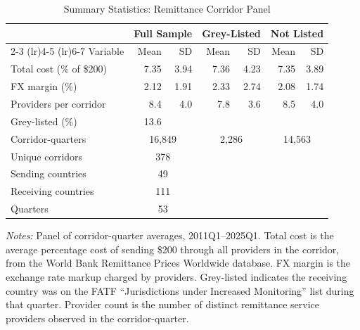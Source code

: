 \begin{table}[H]
\centering
\caption{Summary Statistics: Remittance Corridor Panel}
\label{tab:summary}
\begin{threeparttable}
\begin{tabular}{l rrrr rr}
\toprule
& \multicolumn{2}{c}{Full Sample} & \multicolumn{2}{c}{Grey-Listed} & \multicolumn{2}{c}{Not Listed} \\
\cmidrule(lr){2-3} \cmidrule(lr){4-5} \cmidrule(lr){6-7}
Variable & Mean & SD & Mean & SD & Mean & SD \\
\midrule
Total cost (\% of \$200) & 7.35 & 3.94 & 7.36 & 4.23 & 7.35 & 3.89 \\
FX margin (\%) & 2.12 & 1.91 & 2.33 & 2.74 & 2.08 & 1.74 \\
Providers per corridor & 8.4 & 4.0 & 7.8 & 3.6 & 8.5 & 4.0 \\
Grey-listed (\%) & 13.6 & & & & & \\
\midrule
Corridor-quarters & \multicolumn{2}{c}{16,849} & \multicolumn{2}{c}{2,286} & \multicolumn{2}{c}{14,563} \\
Unique corridors & \multicolumn{2}{c}{378} & & & & \\
Sending countries & \multicolumn{2}{c}{49} & & & & \\
Receiving countries & \multicolumn{2}{c}{111} & & & & \\
Quarters & \multicolumn{2}{c}{53} & & & & \\
\bottomrule
\end{tabular}
\begin{tablenotes}[flushleft]
\small
\item \textit{Notes:} Panel of corridor-quarter averages, 2011Q1--2025Q1. Total cost is the average percentage cost of sending \$200 through all providers in the corridor, from the World Bank Remittance Prices Worldwide database. FX margin is the exchange rate markup charged by providers. Grey-listed indicates the receiving country was on the FATF ``Jurisdictions under Increased Monitoring'' list during that quarter. Provider count is the number of distinct remittance service providers observed in the corridor-quarter.
\end{tablenotes}
\end{threeparttable}
\end{table}
